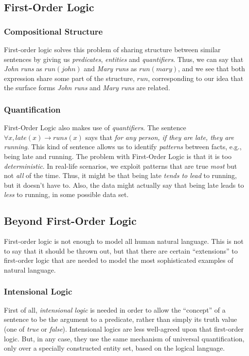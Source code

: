 \documentclass[12pt]{article}
\begin{document}
\subsection{First-Order Logic}
\subsubsection{Compositional Structure}
First-order logic solves this problem of sharing structure between similar sentences by
giving us {\em predicates}, {\em entities} and {\em quantifiers}.
Thus, we can say that {\em John runs} as $run(john)$ and {\em Mary runs} as $run(mary)$,
and we see that both expression share some part of the structure, $run$, corresponding
to our idea that the surface forms {\em John runs} and {\em Mary runs} are related.
\subsubsection{Quantification}
First-Order Logic also makes use of {\em quantifiers}.
The sentence $\forall x, late(x)\rightarrow runs(x)$ says that {\em for any person, if they are late, they are running}.
This kind of sentence allows us to identify {\em patterns} between facts, e.g., being late and running.
The problem with First-Order Logic is that it is too {\em deterministic}.
In real-life scenarios, we exploit patterns that are true {\em most} but not {\em all} of the time.
Thus, it might be that being late {\em tends to lead} to running, but it doesn't have to. Also, the data might actually say that being late leads to {\em less} to running, in some possible data set.

\subsection{Beyond First-Order Logic}
First-order logic is not enough to model all human natural language.
This is not to say that it should be thrown out, but that there are certain ``extensions'' to first-order logic that are needed to model the most sophisticated examples of natural language.
\subsubsection{Intensional Logic}
First of all, {\em intensional logic} is needed in order to allow the ``concept'' of a sentence to be the argument to a predicate, rather than simply its truth value (one of {\em true} or {\em false}).
Intensional logics are less well-agreed upon that first-order logic.
But, in any case, they use the same mechanism of universal quantification, only over a specially constructed entity set, based on the logical language.
\end{document}
